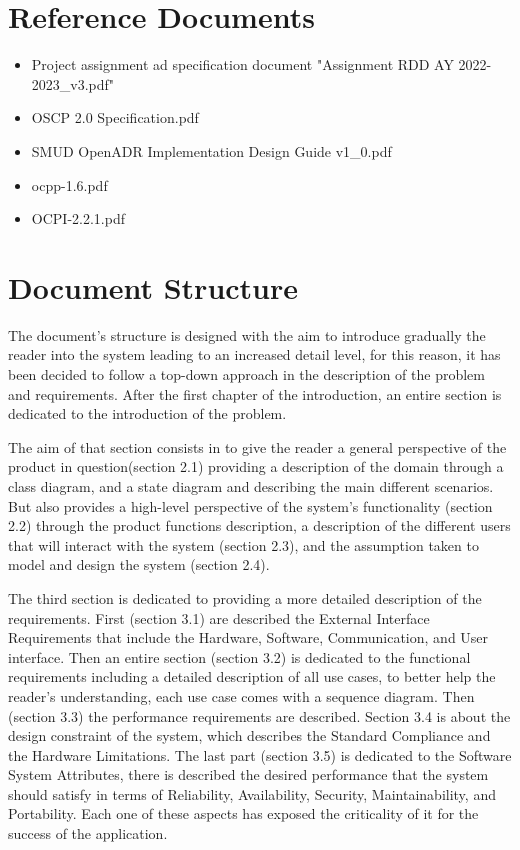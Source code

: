 \documentclass{Configuration_Files/PoliMi3i_thesis}
\begin{document}
\section{Reference Documents}
\begin{itemize}
    \item Project assignment ad specification document "Assignment RDD AY 2022-2023\_v3.pdf"
    \item OSCP 2.0 Specification.pdf
    \item SMUD OpenADR Implementation Design Guide v1\_0.pdf
    \item ocpp-1.6.pdf
    \item OCPI-2.2.1.pdf
\end{itemize}

\section{Document Structure}
The document’s structure is designed with the aim to introduce gradually the reader into the system leading to an increased detail level, for this reason, it has been decided to follow a top-down approach in the description of the problem and requirements. 
After the first chapter of the introduction, an entire section is dedicated to the introduction of the problem. 

The aim of that section consists in to give the reader a general perspective of the product in question(section 2.1) providing a description of the domain through a class diagram, and a state diagram and describing the main different scenarios. But also provides a high-level perspective of the system’s functionality (section 2.2) through the product functions description, a description of the different users that will interact with the system (section 2.3), and the assumption taken to model and design the system  (section 2.4).


The third section is dedicated to providing a more detailed description of the requirements.
First (section 3.1) are described the External Interface Requirements that include the Hardware, Software, Communication, and User interface. 
Then an entire section  (section 3.2) is dedicated to the functional requirements including a detailed description of all use cases, to better help the reader’s understanding, each use case comes with a sequence diagram. 
Then (section 3.3) the performance requirements are described.  
Section 3.4  is about the design constraint of the system, which describes the Standard Compliance and the Hardware Limitations. 
The last part (section 3.5) is dedicated to the Software System Attributes, there is described the desired performance that the system should satisfy in terms of Reliability, Availability, Security, Maintainability, and Portability. Each one of these aspects has exposed the criticality of it for the success of the application.
\end{document}
